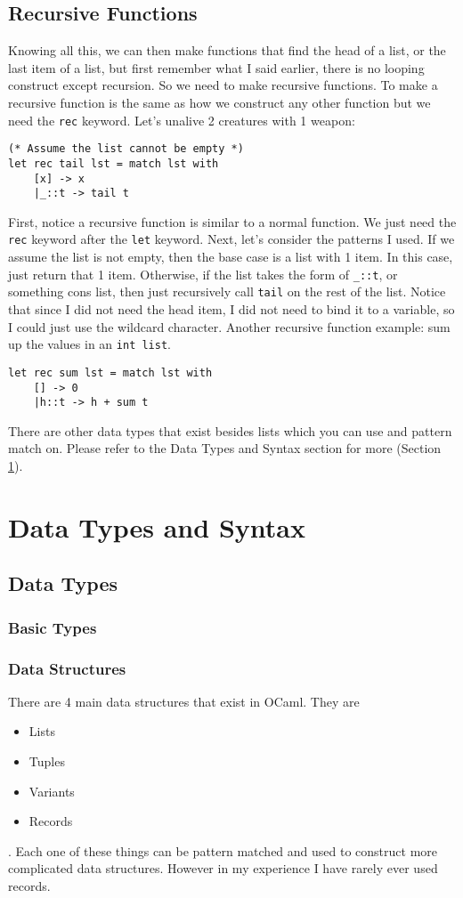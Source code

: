 \documentclass[main.tex]{subfiles}
\begin{document}
\subsection{Recursive Functions}
Knowing all this, we can then make functions that find the head of a list, or the last item of a list, but first remember what I said earlier, there is no looping construct except recursion. So we need to make recursive functions. 
To make a recursive function is the same as how we construct any other function but we need the \texttt{rec} keyword. Let's unalive 2 creatures with 1 weapon:
\begin{lstlisting}[style=Myocamlstyle]
(* Assume the list cannot be empty *)
let rec tail lst = match lst with
    [x] -> x
    |_::t -> tail t
\end{lstlisting}
First, notice a recursive function is similar to a normal function. We just need the \texttt{rec} keyword after the \texttt{let} keyword. Next, let's consider the patterns I used. If we assume the list is not empty, then the base case is a list with 1 item. In this case, just return that 1 item. Otherwise, if the list takes the form of \texttt{\_::t}, or something cons list, then just recursively call \texttt{tail} on the rest of the list. Notice that since I did not need the head item, I did not need to bind it to a variable, so I could just use the wildcard character. 
Another recursive function example: sum up the values in an \texttt{int list}.
\begin{lstlisting}[style=Myocamlstyle]
let rec sum lst = match lst with
    [] -> 0
    |h::t -> h + sum t
\end{lstlisting}
There are other data types that exist besides lists which you can use and pattern match on. Please refer to the Data Types and Syntax section for more (Section \ref{sec:data_type}). 

\section{Data Types and Syntax}\label{sec:data_type}
\subsection{Data Types}
\subsubsection{Basic Types}
\subsubsection{Data Structures}
There are 4 main data structures that exist in OCaml. They are 
\begin{itemize}
    \item Lists
    \item Tuples
    \item Variants
    \item Records
\end{itemize}.
Each one of these things can be pattern matched and used to construct more complicated data structures. However in my experience I have rarely ever used records. 
\end{document}
